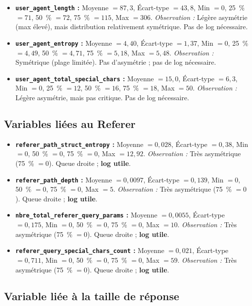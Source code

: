 \documentclass[a4paper,12pt]{article}
\begin{document}
\begin{itemize}
  \item \textbf{\texttt{user\_agent\_length} :} Moyenne $= 87{,}3$, Écart-type $= 43{,}8$, Min $= 0$, 25~\% $= 71$, 50~\% $= 72$, 75~\% $= 115$, Max $= 306$. \emph{Observation :} Légère asymétrie (max élevé), mais distribution relativement symétrique. Pas de log nécessaire.
  \item \textbf{\texttt{user\_agent\_entropy} :} Moyenne $= 4{,}40$, Écart-type $= 1{,}37$, Min $= 0$, 25~\% $= 4{,}49$, 50~\% $= 4{,}71$, 75~\% $= 5{,}18$, Max $= 5{,}48$. \emph{Observation :} Symétrique (plage limitée). Pas d'asymétrie ; pas de log nécessaire.
  \item \textbf{\texttt{user\_agent\_total\_special\_chars} :} Moyenne $= 15{,}0$, Écart-type $= 6{,}3$, Min $= 0$, 25~\% $= 12$, 50~\% $= 16$, 75~\% $= 18$, Max $= 50$. \emph{Observation :} Légère asymétrie, mais pas critique. Pas de log nécessaire.
\end{itemize}

\subsection{Variables liées au Referer}

\begin{itemize}
  \item \textbf{\texttt{referer\_path\_struct\_entropy} :} Moyenne $= 0{,}028$, Écart-type $= 0{,}38$, Min $= 0$, 50~\% $= 0$, 75~\% $= 0$, Max $= 12{,}92$. \emph{Observation :} Très asymétrique (75~\% $= 0$). Queue droite ; \textbf{log utile}.
  \item \textbf{\texttt{referer\_path\_depth} :} Moyenne $= 0{,}0097$, Écart-type $= 0{,}139$, Min $= 0$, 50~\% $= 0$, 75~\% $= 0$, Max $= 5$. \emph{Observation :} Très asymétrique (75~\% $= 0$). Queue droite ; \textbf{log utile}.
  \item \textbf{\texttt{nbre\_total\_referer\_query\_params} :} Moyenne $= 0{,}0055$, Écart-type $= 0{,}175$, Min $= 0$, 50~\% $= 0$, 75~\% $= 0$, Max $= 10$. \emph{Observation :} Très asymétrique (75~\% $= 0$). Queue droite ; \textbf{log utile}.
  \item \textbf{\texttt{referer\_query\_special\_chars\_count} :} Moyenne $= 0{,}021$, Écart-type $= 0{,}711$, Min $= 0$, 50~\% $= 0$, 75~\% $= 0$, Max $= 59$. \emph{Observation :} Très asymétrique (75~\% $= 0$). Queue droite ; \textbf{log utile}.
\end{itemize}

\subsection{Variable liée à la taille de réponse}
\end{document}
